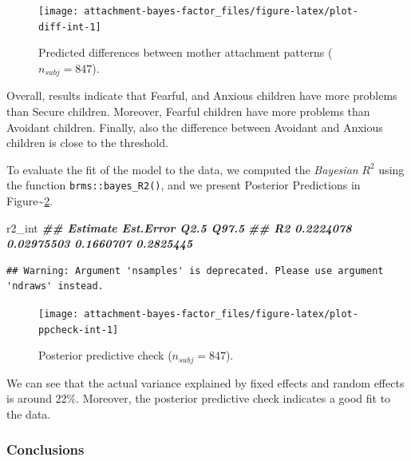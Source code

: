\documentclass[
]{book}
\newenvironment{Shaded}{\begin{snugshade}}{\end{snugshade}}
\newcommand{\DocumentationTok}[1]{\textcolor[rgb]{0.56,0.35,0.01}{\textbf{\textit{#1}}}}
\newcommand{\NormalTok}[1]{#1}
\begin{document}
\begin{figure}

{\centering \texttt{[image: attachment-bayes-factor\_files/figure-latex/plot-diff-int-1]} 

}

\caption{Predicted differences between mother attachment patterns ($n_{subj} = 847$).}\label{fig:plot-diff-int}
\end{figure}

Overall, results indicate that Fearful, and Anxious children have more problems than Secure children. Moreover, Fearful children have more problems than Avoidant children. Finally, also the difference between Avoidant and Anxious children is close to the threshold.

To evaluate the fit of the model to the data, we computed the \emph{Bayesian} \(R^2\) using the function \texttt{brms::bayes\_R2()}, and we present Posterior Predictions in Figure\textasciitilde\ref{fig:plot-ppcheck-int}.

\begin{Shaded}
\begin{Highlighting}[]
\NormalTok{r2\_int}
\DocumentationTok{\#\#     Estimate  Est.Error      Q2.5     Q97.5}
\DocumentationTok{\#\# R2 0.2224078 0.02975503 0.1660707 0.2825445}
\end{Highlighting}
\end{Shaded}

\begin{verbatim}
## Warning: Argument 'nsamples' is deprecated. Please use argument 'ndraws' instead.
\end{verbatim}

\begin{figure}

{\centering \texttt{[image: attachment-bayes-factor\_files/figure-latex/plot-ppcheck-int-1]} 

}

\caption{Posterior predictive check ($n_{subj} = 847$).}\label{fig:plot-ppcheck-int}
\end{figure}

We can see that the actual variance explained by fixed effects and random effects is around 22\%. Moreover, the posterior predictive check indicates a good fit to the data.

\hypertarget{conclusions-5}{%
\subsubsection*{Conclusions}\label{conclusions-5}}
\end{document}
